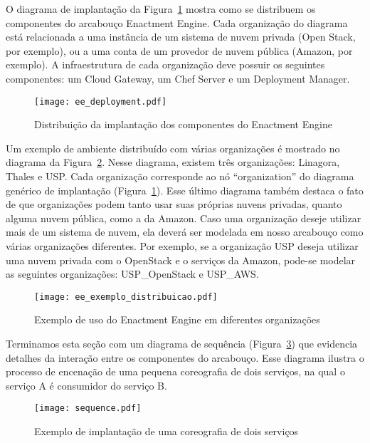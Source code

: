 O diagrama de implantação da Figura~\ref{fig:ee_distribuicao} mostra como se distribuem os componentes do arcabouço Enactment Engine. Cada organização do diagrama está relacionada a uma instância de um sistema de nuvem privada (Open Stack, por exemplo), ou a uma conta de um provedor de nuvem pública (Amazon, por exemplo). A infraestrutura de cada organização deve possuir os seguintes componentes: um Cloud Gateway, um Chef Server e um Deployment Manager. 

\begin{figure}[!h]
  \centering
  \texttt{[image: ee\_deployment.pdf]} 
  \caption{Distribuição da implantação dos componentes do Enactment Engine}
  \label{fig:ee_distribuicao} 
\end{figure}

Um exemplo de ambiente distribuído com várias organizações é mostrado no diagrama da Figura~\ref{fig:ee_exemplo_distribuicao}. Nesse diagrama, existem três organizações: Linagora, Thales e USP. Cada organização corresponde ao nó ``organization'' do diagrama genérico de implantação (Figura~\ref{fig:ee_distribuicao}). Esse último diagrama também destaca o fato de que organizações podem tanto usar suas próprias nuvens privadas, quanto alguma nuvem pública, como a da Amazon. Caso uma organização deseje utilizar mais de um sistema de nuvem, ela deverá ser modelada em nosso arcabouço como várias organizações diferentes. Por exemplo, se a organização USP deseja utilizar uma nuvem privada com o OpenStack e o serviços da Amazon, pode-se modelar as seguintes organizações: USP\_OpenStack e USP\_AWS.

\begin{figure}[!h]
  \centering
  \texttt{[image: ee\_exemplo\_distribuicao.pdf]} 
  \caption{Exemplo de uso do Enactment Engine em diferentes organizações}
  \label{fig:ee_exemplo_distribuicao} 
\end{figure}

Terminamos esta seção com um diagrama de sequência (Figura~\ref{fig:ee_sequencia}) que evidencia detalhes da interação entre os componentes do arcabouço. Esse diagrama ilustra o processo de encenação de uma pequena coreografia de dois serviços, na qual o serviço A é consumidor do serviço B.

\begin{figure}[!h]
  \centering
  \texttt{[image: sequence.pdf]} 
  \caption{Exemplo de implantação de uma coreografia de dois serviços}
  \label{fig:ee_sequencia} 
\end{figure}

